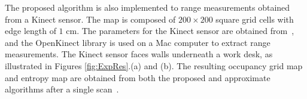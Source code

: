 \documentclass[letterpaper, 10pt, conference]{ieeeconf}
\begin{document}

The proposed algorithm is also implemented to range measurements obtained from a Kinect sensor. The map is composed of $200\times200$ square grid cells with edge length of $1$ cm. The parameters for the Kinect sensor are obtained from~\cite{KhoElb12}, and the OpenKinect library is used on a Mac computer to extract range measurements. The Kinect sensor faces walls underneath a work desk, as illustrated in Figures \ref{fig:ExpRes}.(a) and (b). The resulting occupancy grid map and entropy map are obtained from both the proposed and approximate algorithms after a single scan~\cite{PirRutBisSch11,KhoElb12}. 

\end{document}
